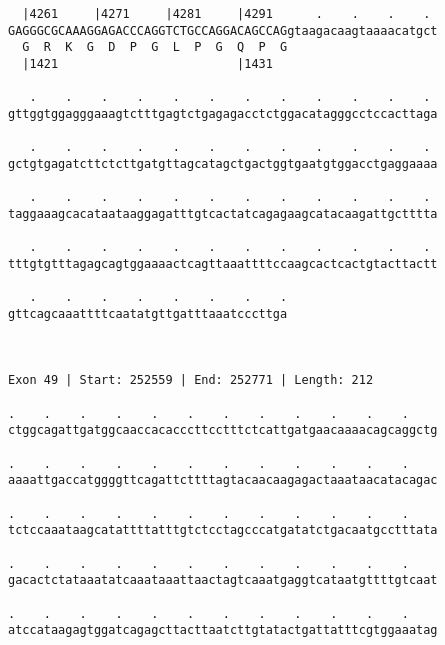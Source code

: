 \documentclass{article}
\begin{document}
\begin{Verbatim}
  |4261     |4271     |4281     |4291      .    .    .    . 
GAGGGCGCAAAGGAGACCCAGGTCTGCCAGGACAGCCAGgtaagacaagtaaaacatgct
  G  R  K  G  D  P  G  L  P  G  Q  P  G                     
  |1421                         |1431                       
  
   .    .    .    .    .    .    .    .    .    .    .    . 
gttggtggagggaaagtctttgagtctgagagacctctggacatagggcctccacttaga
                                                            
   .    .    .    .    .    .    .    .    .    .    .    . 
gctgtgagatcttctcttgatgttagcatagctgactggtgaatgtggacctgaggaaaa
                                                            
   .    .    .    .    .    .    .    .    .    .    .    . 
taggaaagcacataataaggagatttgtcactatcagagaagcatacaagattgctttta
                                                            
   .    .    .    .    .    .    .    .    .    .    .    . 
tttgtgtttagagcagtggaaaactcagttaaattttccaagcactcactgtacttactt
                                                            
   .    .    .    .    .    .    .    .
gttcagcaaattttcaatatgttgatttaaatcccttga
                                       
                                       
 
Exon 49 | Start: 252559 | End: 252771 | Length: 212
 
.    .    .    .    .    .    .    .    .    .    .    .    
ctggcagattgatggcaaccacacccttcctttctcattgatgaacaaaacagcaggctg
                                                            
.    .    .    .    .    .    .    .    .    .    .    .    
aaaattgaccatggggttcagattcttttagtacaacaagagactaaataacatacagac
                                                            
.    .    .    .    .    .    .    .    .    .    .    .    
tctccaaataagcatattttatttgtctcctagcccatgatatctgacaatgcctttata
                                                            
.    .    .    .    .    .    .    .    .    .    .    .    
gacactctataaatatcaaataaattaactagtcaaatgaggtcataatgttttgtcaat
                                                            
.    .    .    .    .    .    .    .    .    .    .    .    
atccataagagtggatcagagcttacttaatcttgtatactgattatttcgtggaaatag
                                                            

\end{Verbatim}
\end{document}
